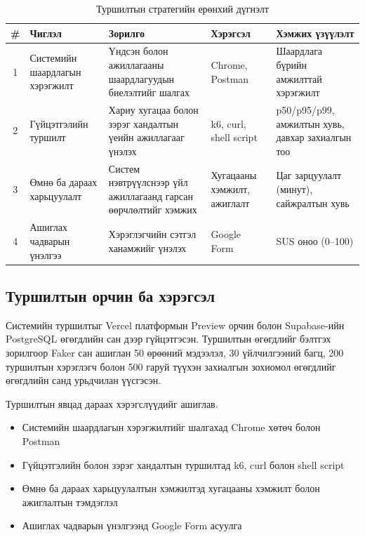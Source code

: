 \begin{table}[H]
  \centering
  \caption{Туршилтын стратегийн ерөнхий дүгнэлт}
  \label{tab:test-strategy}
  \small
  \renewcommand{\arraystretch}{1.2}
  \begin{tabular}{|c|p{3cm}|p{4cm}|p{3cm}|p{4cm}|}
    \hline
    \textbf{\#} & \textbf{Чиглэл} & \textbf{Зорилго} & \textbf{Хэрэгсэл} & \textbf{Хэмжих үзүүлэлт} \\
    \hline
    1 & Системийн шаардлагын хэрэгжилт & Үндсэн болон ажиллагааны шаардлагуудын биелэлтийг шалгах & Chrome, Postman & Шаардлага бүрийн амжилттай хэрэгжилт \\
    \hline
    2 & Гүйцэтгэлийн туршилт & Хариу хугацаа болон зэрэг хандалтын үеийн ажиллагааг үнэлэх & k6, curl, shell script & p50/p95/p99, амжилтын хувь, давхар захиалгын тоо \\
    \hline
    3 & Өмнө ба дараах харьцуулалт & Систем нэвтрүүлснээр үйл ажиллагаанд гарсан өөрчлөлтийг хэмжих & Хугацааны хэмжилт, ажиглалт & Цаг зарцуулалт (минут), сайжралтын хувь \\
    \hline
    4 & Ашиглах чадварын үнэлгээ & Хэрэглэгчийн сэтгэл ханамжийг үнэлэх & Google Form & SUS оноо (0--100) \\
    \hline
  \end{tabular}
\end{table}

\subsection{Туршилтын орчин ба хэрэгсэл}

Системийн туршилтыг Vercel платформын Preview орчин болон Supabase-ийн PostgreSQL өгөгдлийн сан дээр гүйцэтгэсэн. Туршилтын өгөгдлийг бэлтгэх зорилгоор Faker сан ашиглан 50 өрөөний мэдээлэл, 30 үйлчилгээний багц, 200 туршилтын хэрэглэгч болон 500 гаруй түүхэн захиалгын зохиомол өгөгдлийг өгөгдлийн санд урьдчилан үүсгэсэн.

Туршилтын явцад дараах хэрэгслүүдийг ашиглав.

\begin{itemize}
    \item Системийн шаардлагын хэрэгжилтийг шалгахад Chrome хөтөч болон Postman
    \item Гүйцэтгэлийн болон зэрэг хандалтын туршилтад k6, curl болон shell script
    \item Өмнө ба дараах харьцуулалтын хэмжилтэд хугацааны хэмжилт болон ажиглалтын тэмдэглэл
    \item Ашиглах чадварын үнэлгээнд Google Form асуулга
\end{itemize}

